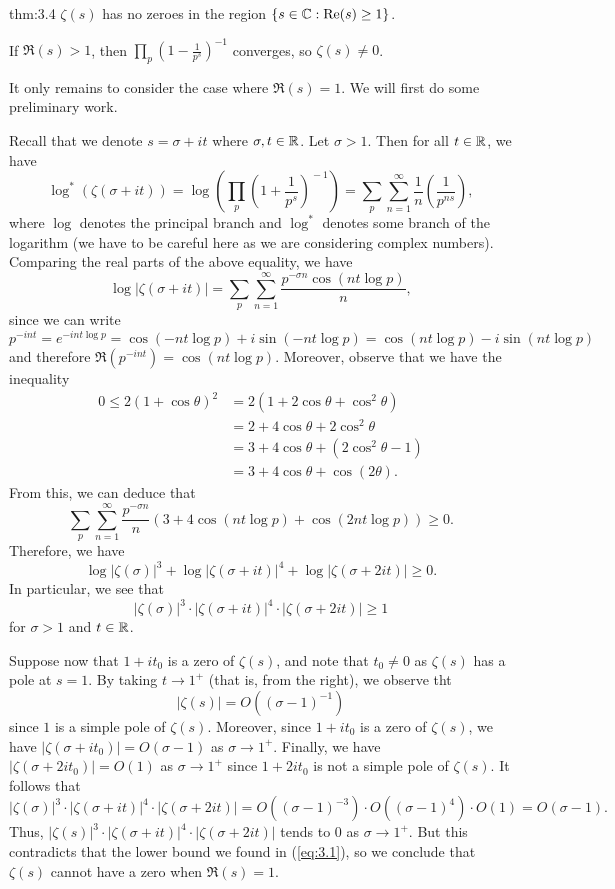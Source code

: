 \begin{theo}{thm:3.4}
$\zeta(s)$ has no zeroes in the region $\{s \in \mathbb{C} : 
{\rm Re}(s) \geq 1\}$. 
\end{theo}
\begin{pf}
If $\Re(s) > 1$, then $\prod_p (1 - \frac1{p^s})^{-1}$ 
converges, so $\zeta(s) \neq 0$. 

It only remains to consider the case where $\Re(s) = 1$. 
We will first do some preliminary work. 

Recall that we denote $s = \sigma + it$ where $\sigma, t \in \mathbb{R}$. Let $\sigma > 1$. Then for all $ t \in \mathbb{R}$, we have 
\[ \log^*(\zeta(\sigma + it)) = 
\log \left( \prod_p \left(1 + \frac1{p^s}\right)^{\!-1}\right) = \sum_p \sum_{n=1}^\infty \frac1n \left( \frac1{p^{ns}} \right), \]
where $\log$ denotes the principal branch and 
$\log^*$ denotes some branch of the logarithm (we have to be
careful here as we are considering complex numbers). Comparing
the real parts of the above equality, we have 
\[ \log|\zeta(\sigma+it)| = \sum_p \sum_{n=1}^\infty 
\frac{p^{-\sigma n} \cos(nt \log p)}{n}, \]
since we can write 
\[ p^{-int} = e^{-int \log p} = \cos(-nt \log p) + 
i \sin(-nt \log p) = \cos(nt \log p) - i\sin(nt \log p) \]
and therefore $\Re(p^{-int}) = \cos(nt \log p)$. 
Moreover, observe that we have the inequality 
\begin{align*}
    0 \leq 2(1+\cos\theta)^2 
    &= 2(1 + 2\cos\theta + \cos^2\theta) \\
    &= 2 + 4\cos\theta + 2\cos^2\theta \\
    &= 3 + 4\cos\theta + (2\cos^2\theta - 1) \\
    &= 3 + 4\cos\theta + \cos(2\theta). 
\end{align*}
From this, we can deduce that 
\[ \sum_p \sum_{n=1}^\infty \frac{p^{-\sigma n}}n 
(3 + 4\cos(nt \log p) + \cos(2nt \log p)) \geq 0. \]
Therefore, we have 
\[ \log|\zeta(\sigma)|^3 + \log|\zeta(\sigma+it)|^4 + 
\log|\zeta(\sigma+2it)| \geq 0. \]
In particular, we see that 
\begin{equation}
    |\zeta(\sigma)|^3 \cdot |\zeta(\sigma + it)|^4 
    \cdot |\zeta(\sigma+2it)| \geq 1 \label{eq:3.1}
\end{equation} 
for $\sigma > 1$ and $t \in \mathbb{R}$. 

Suppose now that $1 + it_0$ is a zero of $\zeta(s)$, 
and note that $t_0 \neq 0$ as $\zeta(s)$ has a pole at 
$s = 1$. By taking $t \to 1^+$ (that is, from the right), 
we observe tht 
\[ |\zeta(s)| = O((\sigma - 1)^{-1}) \]
since $1$ is a simple pole of $\zeta(s)$. Moreover, 
since $1 + it_0$ is a zero of $\zeta(s)$, we have 
$|\zeta(\sigma + it_0)| = O(\sigma-1)$ as 
$\sigma \to 1^+$. Finally, we have 
$|\zeta(\sigma + 2it_0)| = O(1)$ as $\sigma \to 1^+$ 
since $1 + 2it_0$ is not a simple pole of $\zeta(s)$. 
It follows that 
\[ |\zeta(\sigma)|^3 \cdot |\zeta(\sigma + it)|^4 
\cdot |\zeta(\sigma + 2it)| = 
O((\sigma - 1)^{-3}) \cdot O((\sigma - 1)^4) \cdot O(1) 
= O(\sigma - 1). \]
Thus, $|\zeta(s)|^3 \cdot |\zeta(\sigma+it)|^4 \cdot 
|\zeta(\sigma + 2it)|$ tends to $0$ as $\sigma \to 1^+$. 
But this contradicts that the lower bound we found in (\eqref{eq:3.1}), 
so we conclude that $\zeta(s)$ cannot have a zero when 
$\Re(s) = 1$. 
\end{pf}

